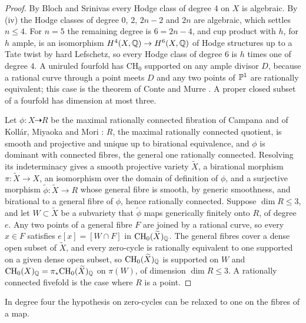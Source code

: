 \begin{proof}
By Bloch and Srinivas \cite{BS83} every Hodge class of degree $4$ on $X$ is
algebraic. By (iv) the Hodge classes of degree $0$, $2$,
$2n-2$ and $2n$ are algebraic, which settles $n\le4$. For $n=5$ the remaining
degree is $6=2n-4$, and cup product with $h$, for $h$ ample, is an isomorphism
$H^{4}(X,\mathbb{Q})\to H^{6}(X,\mathbb{Q})$ of Hodge structures up to a Tate twist by hard
Lefschetz, so every Hodge class of degree $6$ is $h$ times one of degree $4$.
A uniruled fourfold has $\mathrm{CH}_{0}$ supported on any ample divisor $D$,
because a rational curve through a point meets $D$ and any two points of
$\mathbb{P}^{1}$ are rationally equivalent; this case is the theorem of Conte and
Murre \cite{CM78}. A proper closed subset of a fourfold has dimension at
most three.

Let $\phi\colon X\dashrightarrow R$ be the maximal rationally connected
fibration of Campana and of Koll\'ar, Miyaoka and Mori \cite{Cam92,KMM92}:
$R$, the maximal rationally connected quotient, is smooth and projective and
unique up to birational equivalence, and $\phi$ is dominant with connected
fibres, the general one rationally connected. Resolving its indeterminacy
\cite{Hir64} gives a smooth projective variety $\widetilde X$, a birational
morphism $\pi\colon\widetilde X\to X$, an isomorphism over the domain of
definition of $\phi$, and a surjective
morphism $\widetilde\phi\colon\widetilde X\to R$ whose general fibre is
smooth, by generic smoothness, and birational to a general fibre of $\phi$,
hence rationally connected. Suppose $\dim R\le3$, and let
$W\subset\widetilde X$ be a subvariety that $\widetilde\phi$ maps generically
finitely onto $R$, of degree $e$. Any two points of a general fibre $F$ are
joined by a rational curve, so every $x\in F$ satisfies $e[x]=[W\cap F]$ in
$\mathrm{CH}_{0}(\widetilde X)_{\mathbb{Q}}$. The general fibres cover a dense open
subset of $\widetilde X$, and every zero-cycle is rationally equivalent to
one supported on a given dense open subset, so
$\mathrm{CH}_{0}(\widetilde X)_{\mathbb{Q}}$ is supported on $W$ and
$\mathrm{CH}_{0}(X)_{\mathbb{Q}}=\pi_{*}\mathrm{CH}_{0}(\widetilde X)_{\mathbb{Q}}$ on
$\pi(W)$, of dimension $\dim R\le3$. A rationally connected fivefold is the
case where $R$ is a point.
\end{proof}

In degree four the hypothesis on zero-cycles can be relaxed to one on the
fibres of a map.

